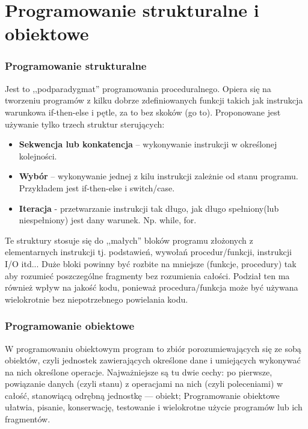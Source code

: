 \documentclass[a4paper,twoside]{report}
\begin{document}
\section{Programowanie strukturalne i obiektowe}
\subsubsection{Programowanie strukturalne}
Jest to ,,podparadygmat'' programowania proceduralnego. Opiera się na tworzeniu programów z kilku dobrze zdefiniowanych funkcji takich jak instrukcja warunkowa if-then-else i pętle, za to bez skoków (go to). Proponowane jest używanie tylko trzech struktur sterujących:
\begin{itemize}
\item \textbf{Sekwencja lub konkatencja} – wykonywanie instrukcji w określonej kolejności.
\item \textbf{Wybór} – wykonywanie jednej z kilu instrukcji zależnie od stanu programu. Przykładem jest if-then-else i switch/case.
\item \textbf{Iteracja} - przetwarzanie instrukcji tak długo, jak długo spełniony(lub niespełniony) jest dany warunek. Np. while, for.
\end{itemize}
Te struktury stosuje się do ,,małych'' bloków programu złożonych z elementarnych instrukcji tj. podstawień, wywołań procedur/funkcji, instrukcji I/O itd... Duże bloki powinny być rozbite na mniejsze (funkcje, procedury) tak aby rozumieć poszczególne fragmenty bez rozumienia całości. Podział ten ma również wpływ na jakość kodu, ponieważ procedura/funkcja może być używana wielokrotnie bez niepotrzebnego powielania kodu.
\medskip 

\subsubsection{Programowanie obiektowe}
W programowaniu obiektowym program to zbiór porozumiewających się ze sobą obiektów, czyli jednostek zawierających określone dane i umiejących wykonywać na nich określone operacje. Najważniejsze są tu dwie cechy: po pierwsze, powiązanie danych (czyli stanu) z operacjami na nich (czyli poleceniami) w całość, stanowiącą odrębną jednostkę — obiekt; Programowanie obiektowe ułatwia, pisanie, konserwację, testowanie i wielokrotne użycie programów lub ich fragmentów.
\medskip 
\end{document}

